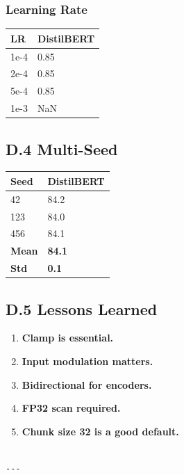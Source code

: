 \subsubsection{Learning Rate}

\begin{table}[H]
\centering
\small
\begin{tabular}{ll}
\toprule
\textbf{LR} & \textbf{DistilBERT} \\
\midrule
1e-4 & 0.85 \\
2e-4 & 0.85 \\
5e-4 & 0.85 \\
1e-3 & NaN \\
\bottomrule
\end{tabular}
\end{table}

\subsection{D.4 Multi-Seed}

\begin{table}[H]
\centering
\small
\begin{tabular}{ll}
\toprule
\textbf{Seed} & \textbf{DistilBERT} \\
\midrule
42 & 84.2 \\
123 & 84.0 \\
456 & 84.1 \\
\textbf{Mean} & \textbf{84.1} \\
\textbf{Std} & \textbf{0.1} \\
\bottomrule
\end{tabular}
\end{table}

\subsection{D.5 Lessons Learned}

\begin{enumerate}
\item \textbf{Clamp is essential.}
\item \textbf{Input modulation matters.}
\item \textbf{Bidirectional for encoders.}
\item \textbf{FP32 scan required.}
\item \textbf{Chunk size 32 is a good default.}
\end{enumerate}
\begin{lstlisting}

---
\end{lstlisting}